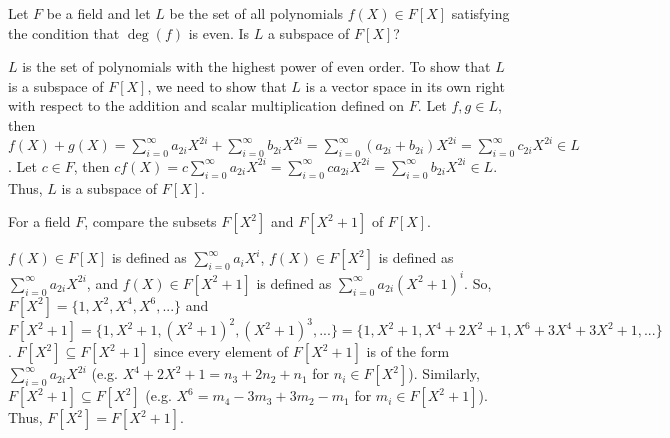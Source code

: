 \begin{ProbBox} %
\begin{problem}[Golan 133]
Let $F$ be a field and let $L$ be the set of all polynomials $f(X) \in F[X]$
satisfying the condition that $\deg(f)$ is even.  Is $L$ a subspace of $F[X]$?
\end{problem}
\smallskip
\begin{solution}
$L$ is the set of polynomials with the highest power of even order. To show that $L$ is a subspace of $F[X]$, we need to show that $L$ is a vector space in its own right with respect to the addition and scalar multiplication defined on $F$. Let $f,g \in L$, then $f(X)+g(X)=\sum\limits_{i=0}^\infty a_{2i}X^{2i} + \sum\limits_{i=0}^\infty b_{2i}X^{2i} = \sum\limits_{i=0}^\infty (a_{2i} + b_{2i})X^{2i} = \sum\limits_{i=0}^\infty c_{2i}X^{2i} \in L$. Let $c \in F$, then $cf(X) = c\sum\limits_{i=0}^\infty a_{2i}X^{2i} = \sum\limits_{i=0}^\infty ca_{2i}X^{2i} = \sum\limits_{i=0}^\infty b_{2i}X^{2i} \in L$. Thus, $L$ is a subspace of $F[X]$.
\end{solution}
\end{ProbBox}
\probskip

\begin{ProbBox} %
\begin{problem}[Golan 142]
For a field $F$, compare the subsets $F[X^2]$ and $F[X^2+1]$ of $F[X]$.
\end{problem}
\smallskip
\begin{solution}
$f(X) \in F[X]$ is defined as $\sum\limits_{i=0}^\infty a_{i}X^{i}$, $f(X) \in F[X^2]$ is defined as $\sum\limits_{i=0}^\infty a_{2i}X^{2i}$, and $f(X) \in F[X^2+1]$ is defined as $\sum\limits_{i=0}^\infty a_{2i}(X^{2}+1)^i$. So, $F[X^2]=\{1,X^2,X^4,X^6,...\}$ and $F[X^2+1]=\{1,X^2+1,(X^2+1)^2,(X^2+1)^3,...\} = \{1,X^2+1,X^4+2X^2+1,X^6+3X^4+3X^2+1,...\}$. $F[X^2] \subseteq F[X^2+1]$ since every element of $F[X^2+1]$ is of the form $\sum\limits_{i=0}^\infty a_{2i}X^{2i}$ (e.g. $X^4+2X^2+1 = n_3+2n_2+n_1$ for $n_i \in F[X^2]$). Similarly, $F[X^2+1] \subseteq F[X^2]$ (e.g. $X^6=m_4-3m_3+3m_2-m_1$ for $m_i \in F[X^2+1]$). Thus, $F[X^2]=F[X^2+1]$.
\end{solution}
\end{ProbBox}
\probskip

